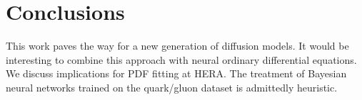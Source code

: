 \section{Conclusions}\label{sec:conclusions}

This work paves the way for a new generation of diffusion models. It
would be interesting to combine this approach with neural ordinary
differential equations. We discuss implications for PDF fitting at HERA.
The treatment of Bayesian neural networks trained on the quark/gluon
dataset is admittedly heuristic.


